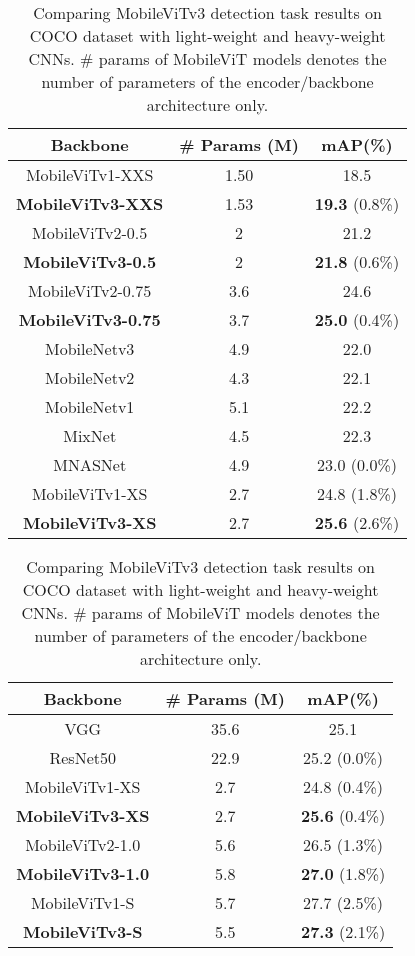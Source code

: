 \documentclass{article} \usepackage{iclr2022_conference,times}
\begin{document}
\begin{table}[!htb]
    \begin{subtable}[c]{0.5\textwidth}
        \centering
        \scriptsize
        \begin{tabular}{ccc} \toprule 
        Backbone & \# Params (M) & mAP(\%) \\ \midrule
        MobileViTv1-XXS & 1.50 & 18.5\\
        \textbf{MobileViTv3-XXS} & 1.53 & \textbf{19.3} (0.8\%)\\
        \midrule
        MobileViTv2-0.5 & 2 & 21.2  \\
        \textbf{MobileViTv3-0.5} & 2 & \textbf{21.8} (0.6\%)  \\
        \midrule
        MobileViTv2-0.75 & 3.6 & 24.6  \\
        \textbf{MobileViTv3-0.75} & 3.7 & \textbf{25.0} (0.4\%) \\
        \midrule
        MobileNetv3 & 4.9 & 22.0\\
        MobileNetv2 & 4.3 & 22.1\\
        MobileNetv1 & 5.1 & 22.2\\
        MixNet & 4.5 & 22.3\\
        MNASNet & 4.9 & 23.0 (0.0\%)\\
        MobileViTv1-XS & 2.7 & 24.8 (1.8\%)\\
        \textbf{MobileViTv3-XS} & 2.7 & \textbf{25.6} (2.6\%)\\
        \bottomrule
        \end{tabular}
        \label{table:detlight}
    \end{subtable}
    \begin{subtable}[c]{0.5\textwidth}
        \centering
        \scriptsize
        \begin{tabular}{ccc}
        \toprule 
        Backbone & \# Params (M) & mAP(\%) \\
        \midrule 
        VGG & 35.6 & 25.1\\
        ResNet50 & 22.9 & 25.2 (0.0\%)\\
        MobileViTv1-XS & 2.7 & 24.8 (0.4\%)\\
        \textbf{MobileViTv3-XS} & 2.7 & \textbf{25.6} (0.4\%)\\
        MobileViTv2-1.0 & 5.6 & 26.5 (1.3\%) \\
        \textbf{MobileViTv3-1.0} & 5.8 & \textbf{27.0} (1.8\%) \\
        MobileViTv1-S & 5.7 & 27.7 (2.5\%)\\
        \textbf{MobileViTv3-S} & 5.5 & \textbf{27.3} (2.1\%)\\
        
        \bottomrule
        \end{tabular}
        \label{table:detheavy}
    \end{subtable}
    \caption{Comparing MobileViTv3 detection task results on COCO dataset with light-weight and heavy-weight CNNs. \# params of MobileViT models denotes the number of parameters of the encoder/backbone architecture only.}
\end{table}
\end{document}
